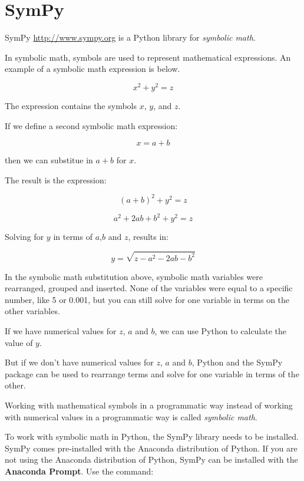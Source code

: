 \documentclass{book}
\begin{document}
    
        \section{SymPy}\label{sympy}
    




    
        SymPy \url{http://www.sympy.org} is a Python library for \emph{symbolic
math}.

In symbolic math, symbols are used to represent mathematical
expressions. An example of a symbolic math expression is below.

\[ x^{2} + y^{2} = z \]

The expression contains the symbols \(x\), \(y\), and \(z\).

If we define a second symbolic math expression:

\[ x = a + b \]

then we can substitue in \(a + b\) for \(x\).

The result is the expression:

\[ (a + b)^{2} + y^{2} = z \]

\[ a^{2} + 2ab + b^{2} + y^{2} = z \]

Solving for \(y\) in terms of \(a\),\(b\) and \(z\), results in:

\[ y = \sqrt{z - a^{2} - 2ab - b^{2}} \]

In the symbolic math substitution above, symbolic math variables were
rearranged, grouped and inserted. None of the variables were equal to a
specific number, like 5 or 0.001, but you can still solve for one
variable in terms on the other variables.
    




    
        If we have numerical values for \(z\), \(a\) and \(b\), we can use
Python to calculate the value of \(y\).

But if we don't have numerical values for \(z\), \(a\) and \(b\), Python
and the SymPy package can be used to rearrange terms and solve for one
variable in terms of the other.

Working with mathematical symbols in a programmatic way instead of
working with numerical values in a programmatic way is called
\emph{symbolic math}.
    




    
        To work with symbolic math in Python, the SymPy library needs to be
installed. SymPy comes pre-installed with the Anaconda distribution of
Python. If you are not using the Anaconda distribution of Python, SymPy
can be installed with the \textbf{Anaconda Prompt}. Use the command:
\end{document}

